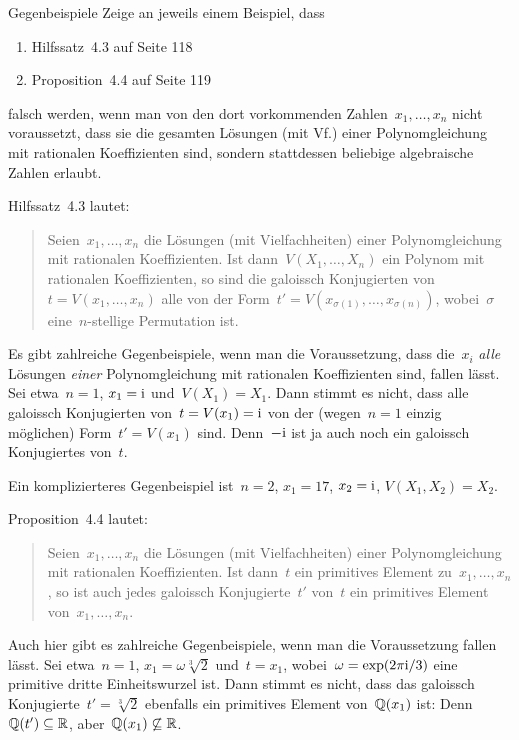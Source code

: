 \documentclass{algblatt}
\begin{document}
\begin{aufgabe}{Gegenbeispiele}
Zeige an jeweils einem Beispiel, dass
\begin{enumerate}
\item Hilfssatz~4.3 auf Seite 118
\item Proposition~4.4 auf Seite 119
\end{enumerate}
falsch werden, wenn man von den dort vorkommenden Zahlen~$x_1,\ldots,x_n$ nicht
voraussetzt, dass sie die gesamten Lösungen (mit Vf.) einer Polynomgleichung
mit rationalen Koeffizienten sind, sondern stattdessen beliebige algebraische
Zahlen erlaubt.

\begin{loesungE}
\item Hilfssatz~4.3 lautet:
\begin{quote}
Seien~$x_1,\ldots,x_n$ die Lösungen (mit Vielfachheiten) einer Polynomgleichung
mit rationalen Koeffizienten. Ist dann~$V(X_1,\ldots,X_n)$ ein Polynom mit
rationalen Koeffizienten, so sind die galoissch Konjugierten von~$t =
V(x_1,\ldots,x_n)$ alle von der Form~$t' =
V(x_{\sigma(1)},\ldots,x_{\sigma(n)})$, wobei~$\sigma$ eine~$n$-stellige
Permutation ist.
\end{quote}
Es gibt zahlreiche Gegenbeispiele, wenn man die Voraussetzung, dass die~$x_i$
\emph{alle} Lösungen \emph{einer} Polynomgleichung
mit rationalen Koeffizienten sind, fallen lässt. Sei etwa~$n = 1$, $x_1 = \mathrm{i}$
und~$V(X_1) = X_1$. Dann stimmt es nicht, dass alle galoissch Konjugierten
von~$t = V(x_1) = \mathrm{i}$ von der (wegen~$n = 1$ einzig möglichen) Form~$t' =
V(x_1)$ sind. Denn~$-\mathrm{i}$ ist ja auch noch ein galoissch Konjugiertes von~$t$.

Ein komplizierteres Gegenbeispiel ist~$n = 2$, $x_1 = 17$, $x_2 = \mathrm{i}$,
$V(X_1,X_2) = X_2$.

\item Proposition~4.4 lautet:
\begin{quote}
Seien~$x_1,\ldots,x_n$ die Lösungen (mit Vielfachheiten) einer Polynomgleichung
mit rationalen Koeffizienten. Ist dann~$t$ ein primitives Element
zu~$x_1,\ldots,x_n$, so ist auch jedes galoissch Konjugierte~$t'$ von~$t$ ein
primitives Element von~$x_1,\ldots,x_n$.
\end{quote}
Auch hier gibt es zahlreiche Gegenbeispiele, wenn man die Voraussetzung fallen
lässt. Sei etwa~$n = 1$, $x_1 = \omega\sqrt[3]{2}$ und~$t = x_1$,
wobei~$\omega = \exp(2\pi\mathrm{i}/3)$ eine primitive dritte Einheitswurzel ist. Dann stimmt es
nicht, dass das galoissch Konjugierte~$t' = \sqrt[3]{2}$ ebenfalls ein
primitives Element von~$\mathbb{Q}(x_1)$ ist: Denn~$\mathbb{Q}(t') \subseteq \mathbb{R}$,
aber~$\mathbb{Q}(x_1) \not\subseteq \mathbb{R}$.
\end{loesungE}
\end{aufgabe}
\end{document}

